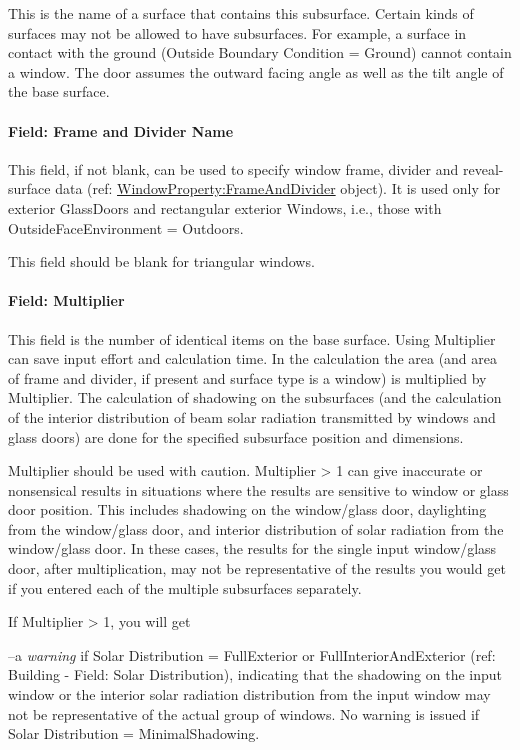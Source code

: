 This is the name of a surface that contains this subsurface. Certain kinds of surfaces may not be allowed to have subsurfaces. For example, a surface in contact with the ground (Outside Boundary Condition = Ground) cannot contain a window. The door assumes the outward facing angle as well as the tilt angle of the base surface.

\paragraph{Field: Frame and Divider Name}\label{field-frame-and-divider-name-1}

This field, if not blank, can be used to specify window frame, divider and reveal-surface data (ref: \hyperref[windowpropertyframeanddivider]{WindowProperty:FrameAndDivider} object). It is used only for exterior GlassDoors and rectangular exterior Windows, i.e., those with OutsideFaceEnvironment = Outdoors.

This field should be blank for triangular windows.

\paragraph{Field: Multiplier}\label{field-multiplier-3}

This field is the number of identical items on the base surface. Using Multiplier can save input effort and calculation time. In the calculation the area (and area of frame and divider, if present and surface type is a window) is multiplied by Multiplier. The calculation of shadowing on the subsurfaces (and the calculation of the interior distribution of beam solar radiation transmitted by windows and glass doors) are done for the specified subsurface position and dimensions.

Multiplier should be used with caution. Multiplier \textgreater{} 1 can give inaccurate or nonsensical results in situations where the results are sensitive to window or glass door position. This includes shadowing on the window/glass door, daylighting from the window/glass door, and interior distribution of solar radiation from the window/glass door. In these cases, the results for the single input window/glass door, after multiplication, may not be representative of the results you would get if you entered each of the multiple subsurfaces separately.

If Multiplier \textgreater{} 1, you will get

--a \emph{warning} if Solar Distribution = FullExterior or FullInteriorAndExterior (ref: Building - Field: Solar Distribution), indicating that the shadowing on the input window or the interior solar radiation distribution from the input window may not be representative of the actual group of windows. No warning is issued if Solar Distribution = MinimalShadowing.

